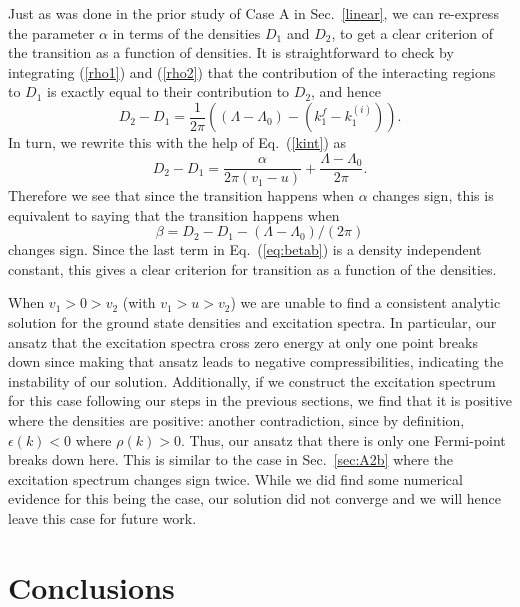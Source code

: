 \documentclass[aps,pra,
superscriptaddress,
reprint,twocolumn,preprintnumbers,
amsmath,amssymb,
nofootinbib]{revtex4-1}
\begin{document}
Just as was done in the prior study of Case A in Sec.~\ref{linear}, we can re-express the parameter $\alpha$ in terms of the densities $D_1$ and $D_2$, to get a clear criterion of the transition as a function
of densities. It is straightforward to check by integrating (\ref{rho1}) and (\ref{rho2})  that the contribution of the interacting regions to $D_1$ is exactly equal to their contribution to $D_2$, and hence
\begin{equation} D_2 - D_1  = \frac 1 {2 \pi} \left(  \left(\Lambda- \Lambda_0 \right) -  \left( k_1^f - k_1^{(i)} \right) \right).
\end{equation}
In turn, we rewrite this with the help of Eq.~(\ref{kint}) as
\begin{equation} D_2 - D_1 = \frac{\alpha}{2 \pi  (v_1-u)} + \frac{\Lambda-\Lambda_0}{2\pi}.
\end{equation}
Therefore we see that since the transition happens when $\alpha$ changes sign, this is equivalent to saying that the transition happens when
\begin{equation} \label{eq:betab} \beta = D_2 - D_1 - (\Lambda-\Lambda_0)/(2\pi) \end{equation} changes sign. Since the last term in Eq.~(\ref{eq:betab}) is a density independent constant, this gives a clear criterion for transition as a function of the densities. 
      
When $v_1>0>v_2$ (with $v_1>u>v_2$) we are unable to find a consistent analytic solution for the ground state densities and excitation spectra. In particular, our ansatz that the excitation spectra cross zero energy at only one point breaks down since making that ansatz leads to negative compressibilities, indicating the instability of our solution. Additionally, if we construct the excitation spectrum for this case following our steps in the previous sections, we find that it is positive where the densities are positive: another contradiction, since by definition, $\epsilon(k) < 0$ where $\rho(k) > 0$. Thus, our ansatz that there is only one Fermi-point breaks down here. This is similar to the case in Sec.~\ref{sec:A2b} where the excitation spectrum changes sign twice. While we did find some numerical evidence for this being the case, our solution did not converge and we will hence leave this case for future work.  


\section{Conclusions}
\label{cncls}
\end{document}
